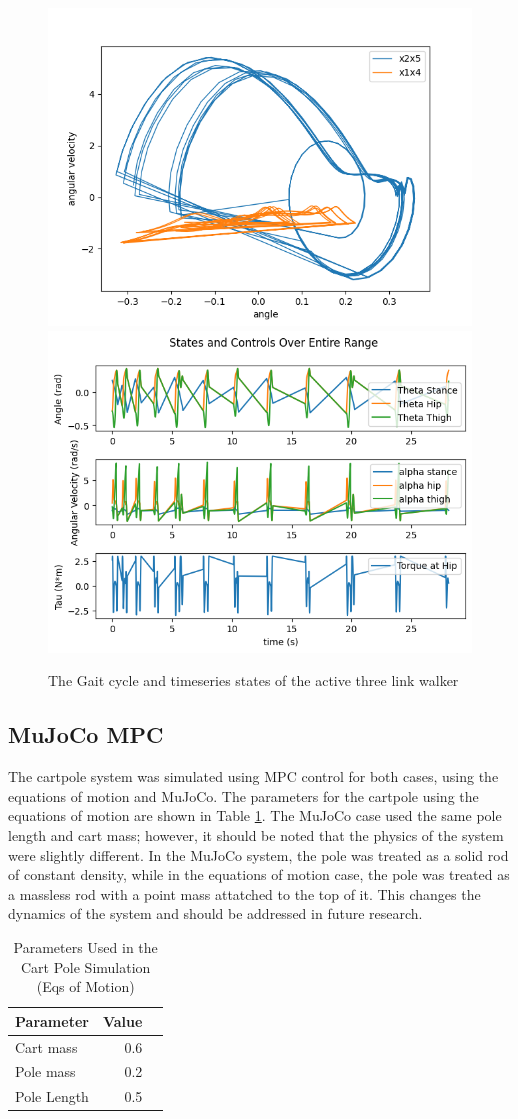 \documentclass{./springer/svjour3}
\begin{document}
\begin{figure}[!h]
  \centering
  \includegraphics[width=.4\linewidth]{./figures/three_gait.png} %
  \includegraphics[width=.4\linewidth]{./figures/timeseries_data.png}
  \caption{The Gait cycle and timeseries states of the active three link walker}
  \label{fig:active_sol}
\end{figure}

\subsection{MuJoCo MPC}
The cartpole system was simulated using MPC control for both cases, using the equations of motion and MuJoCo. The parameters for the cartpole using the equations of motion are shown 
in Table \ref{tab:cartpole_params}. The MuJoCo case used the same pole length and cart mass; however, it should be noted that the physics of the system were slightly different.
In the MuJoCo system, the pole was treated as a solid rod of constant density, while in the equations of motion case, the pole was treated as a massless rod 
with a point mass attatched to the top of it. This changes the dynamics of the system and should be addressed in future research.

\begin{table}[h]
  \centering
  \caption{Parameters Used in the Cart Pole Simulation (Eqs of Motion)}
  \begin{tabular}{lrr}
  \toprule
  Parameter & Value\\
  \midrule
  Cart mass & 0.6 \\
  Pole mass & 0.2\\
  Pole Length & 0.5\\
  \end{tabular}
  \label{tab:cartpole_params}
\end{table}
\end{document}
